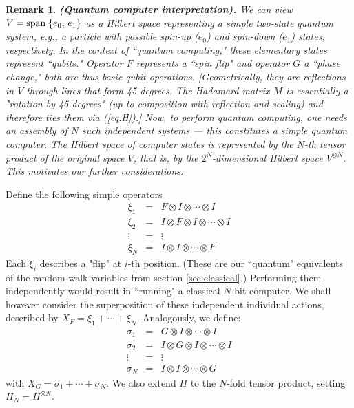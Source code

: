 \documentclass[12pt]{article}    %
\newtheorem{remark}[thm]{Remark}          %
\begin{document}
\begin{remark} {\bf (Quantum computer interpretation).}
\rm 
We can view $V=\hbox{span}\;\{e_0,\,e_1\}$ as a Hilbert space 
representing a simple two-state quantum system, e.g., 
a particle with possible spin-up ($e_0$) and spin-down ($e_1$) states, 
respectively.
In the context of ``quantum computing," these elementary states represent 
``qubits."  Operator $F$ represents a ``spin flip" and operator $G$ 
a  ``phase change,"  both are thus basic qubit operations. 
[Geometrically, they are reflections in $V$ through lines 
that form 45 degrees.  The Hadamard matrix $M$ is essentially 
a "rotation by 45 degrees" (up to composition with reflection and scaling) 
and therefore ties them via (\ref{eq:H}).] 
Now, to perform quantum computing, one needs an assembly of $N$ such
independent systems --- this constitutes a simple quantum computer.  
The Hilbert space of computer states is represented 
by the $N$-th tensor product of the original space $V$,
that is, by the $2^N$-dimensional Hilbert space $V^{\otimes N}$. 
This motivates our further considerations. 
\end{remark}



Define the following simple operators
\begin{eqnarray*}
\xi_1 &=& F\otimes I \otimes\cdots\otimes I          \\
\xi_2 &=& I\otimes F\otimes I \otimes\cdots\otimes I \\
\vdots &=& \vdots                                    \\
\xi_N &=& I\otimes I \otimes\cdots\otimes F
\end{eqnarray*}
%
Each $\xi_i$ describes a "flip" at $i$-th position.
(These are our ``quantum" equivalents of the random walk variables 
from section \ref{sec:classical}.)
Performing them independently would result in ``running" 
a classical $N$-bit computer.
We shall however consider the superposition of these independent 
individual actions,  described by $X_F=\xi_1+\cdots+\xi_N$. 
Analogously, we define:
%
\begin{eqnarray*}
\sigma_1 &=& G\otimes I \otimes\cdots\otimes I\\
\sigma_2 &=& I\otimes G\otimes I \otimes\cdots\otimes I\\
\vdots &=& \vdots \\
\sigma_N &=& I\otimes I \otimes\cdots\otimes G
\end{eqnarray*}
%
with $X_G=\sigma_1+\cdots+\sigma_N$. 
We also extend $H$ to the $N$-fold tensor product, 
setting $H_N=H^{\otimes N}$. 
\\
\end{document}
